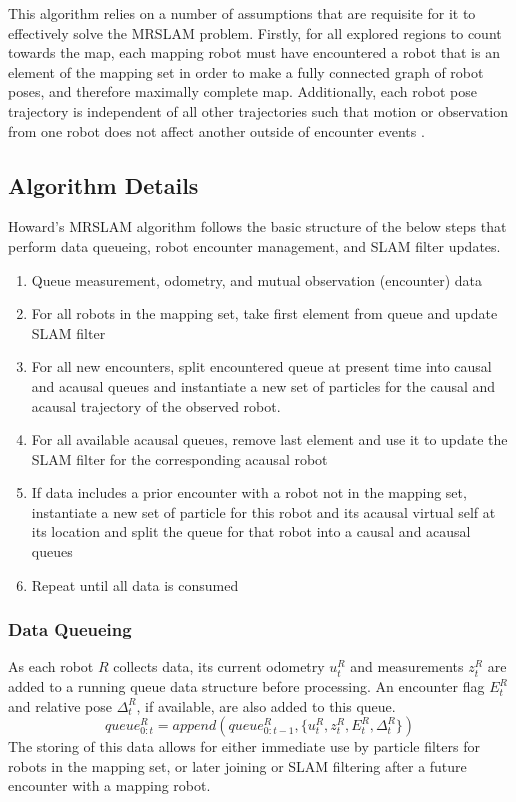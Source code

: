 This algorithm relies on a number of assumptions that are requisite for it to effectively solve the MRSLAM problem. Firstly, for all explored regions to count towards the map, each mapping robot must have encountered a robot that is an element of the mapping set in order to make a fully connected graph of robot poses, and therefore maximally complete map. Additionally, each robot pose trajectory is independent of all other trajectories such that motion or observation from one robot does not affect another outside of encounter events \cite{howard2006multi}.

	
\subsection{Algorithm Details}
\label{SS:Alg:Details}
Howard’s MRSLAM algorithm follows the basic structure of the below steps that perform data queueing, robot encounter management, and SLAM filter updates.
\begin{enumerate}
\item Queue measurement, odometry, and mutual observation (encounter) data
\item For all robots in the mapping set, take first element from queue and update SLAM filter
\item For all new encounters, split encountered queue at present time into causal and acausal queues and instantiate a new set of particles for the causal and acausal trajectory of the observed robot.
\item For all available acausal queues, remove last element and use it to update the SLAM filter for the corresponding acausal robot
\item If data includes a prior encounter with a robot not in the mapping set, instantiate a new set of particle for this robot and its acausal virtual self at its location and split the queue for that robot into a causal and acausal queues
\item Repeat until all data is consumed
\end{enumerate}

\subsubsection{Data Queueing}
As each robot $R$ collects data, its current odometry $u_t^R$ and measurements $z_t^R$ are added to a running queue data structure before processing. An encounter flag $E_t^R$ and relative pose $\Delta_t^R$, if available, are also added to this queue. 
$$queue_{0:t}^R = append(queue_{0:t-1}^R, \{ u_t^R, z_t^R, E_t^R, \Delta_t^R \})$$
The storing of this data allows for either immediate use by particle filters for robots in the mapping set, or later joining or SLAM filtering after a future encounter with a mapping robot.

